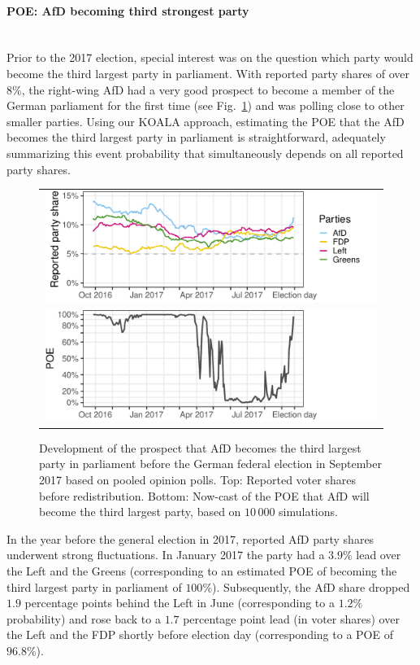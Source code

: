 \documentclass[smallcondensed]{svjour3}     %
\begin{document}
\paragraph{POE: AfD becoming third strongest party} \ \\
Prior to the 2017 election, special interest was on the question
which party would become the third largest party in parliament.
With reported party shares of over $8\%$, the right-wing AfD had a very good
prospect to become a member of the German parliament for the first time
(see Fig.~\ref{fig:2017_afd}) and was polling close to other smaller parties.
Using our KOALA approach, estimating the POE that the AfD becomes
the third largest party in parliament is straightforward, adequately summarizing
this event probability that simultaneously depends on all reported party shares.

\begin{figure}[H]\centering
\begin{tabular}{l}
\includegraphics[height=.2\textwidth]{figures/2017_pooled_afd_rawShares.pdf}
\\
\includegraphics[height=.2\textwidth]{figures/2017_pooled_afd_thirdPartyProb.pdf}
\end{tabular}
\caption{Development of the prospect that AfD becomes the third largest party
in parliament before the German federal election in September 2017 based on pooled
opinion polls.
Top: Reported voter shares before redistribution.
Bottom: Now-cast of the POE that AfD will become the third largest party,
based on $10\,000$ simulations.
\label{fig:2017_afd}
}
\end{figure}

In the year before the general election in 2017, reported AfD party shares
underwent strong fluctuations. In January 2017 the party had a $3.9\%$ lead
over the Left and the Greens (corresponding to an estimated POE of
becoming the third largest party in parliament of $100\%$). Subsequently, the
AfD share dropped $1.9$ percentage points behind the Left in June
(corresponding to a $1.2\%$ probability)
and rose back to a $1.7$ percentage point lead (in voter shares) over the Left
and the FDP shortly before election day (corresponding to a POE of $96.8\%$).
\end{document}

